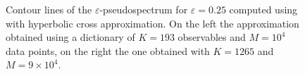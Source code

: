 \begin{figure}[h]
{\begin{subfigure}{0.45\textwidth}
    \end{subfigure}\hspace*{\fill}
        }
    \caption{Contour lines of the $\varepsilon$-pseudospectrum for $\varepsilon = 0.25$ computed using  with hyperbolic cross approximation. On the left the approximation obtained using a dictionary of $K=193$ observables and $M = 10^4$ data points, on the right the one obtained with $K=1265$ and $M = 9 \times 10^4$.}
    \label{pendulum_pseudospectrum}
\end{figure}

\begin{figure}[h]
\centering
{}
\end{figure}

